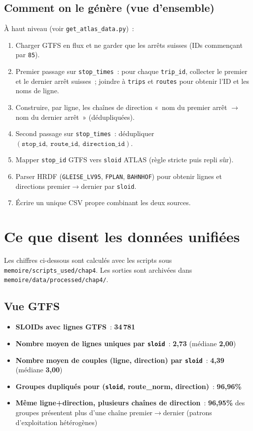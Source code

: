 \subsection{Comment on le génère (vue d'ensemble)}
À haut niveau (voir \texttt{get\_atlas\_data.py}) :
\begin{enumerate}
  \item Charger GTFS en flux et ne garder que les arrêts suisses (IDs commençant par \texttt{85}).
  \item Premier passage sur \texttt{stop\_times} : pour chaque \texttt{trip\_id}, collecter le premier et le dernier arrêt suisses ; joindre à \texttt{trips} et \texttt{routes} pour obtenir l'ID et les noms de ligne.
  \item Construire, par ligne, les chaînes de direction « nom du premier arrêt $\rightarrow$ nom du dernier arrêt » (dédupliquées).
  \item Second passage sur \texttt{stop\_times} : dédupliquer \((\texttt{stop\_id},\ \texttt{route\_id},\ \texttt{direction\_id})\).
  \item Mapper \texttt{stop\_id} GTFS vers \texttt{sloid} ATLAS (règle stricte puis repli sûr).
  \item Parser HRDF (\texttt{GLEISE\_LV95}, \texttt{FPLAN}, \texttt{BAHNHOF}) pour obtenir lignes et directions premier$\rightarrow$dernier par \texttt{sloid}.
  \item Écrire un unique CSV propre combinant les deux sources.
\end{enumerate}

\section{Ce que disent les données unifiées}
Les chiffres ci-dessous sont calculés avec les scripts sous \texttt{memoire/scripts\_used/chap4}. Les sorties sont archivées dans \texttt{memoire/data/processed/chap4/}.

\subsection*{Vue GTFS}
\begin{itemize}
  \item \textbf{SLOIDs avec lignes GTFS} : \textbf{34\,781}
  \item \textbf{Nombre moyen de lignes uniques par \texttt{sloid}} : \textbf{2,73} (médiane \textbf{2,00})
  \item \textbf{Nombre moyen de couples (ligne, direction) par \texttt{sloid}} : \textbf{4,39} (médiane \textbf{3,00})
  \item \textbf{Groupes dupliqués pour (\texttt{sloid}, route\_norm, direction)} : \textbf{96,96\%}
  \item \textbf{Même ligne+direction, plusieurs chaînes de direction} : \textbf{96,95\%} des groupes présentent plus d'une chaîne premier$\rightarrow$dernier (patrons d'exploitation hétérogènes)
\end{itemize}

